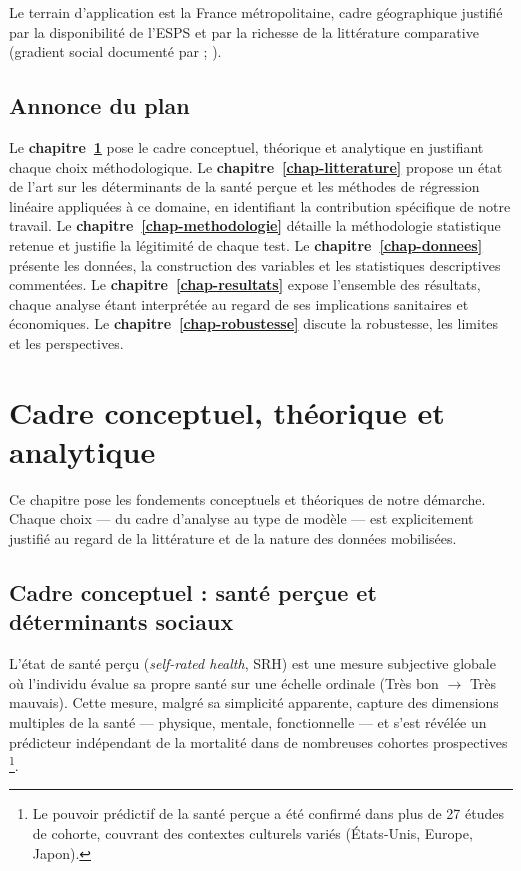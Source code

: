 \documentclass[11pt,a4paper]{memoirerecherche}
\begin{document}
Le terrain d'application est la France métropolitaine, cadre géographique justifié par la disponibilité de l'ESPS et par la richesse de la littérature comparative (gradient social documenté par \textcite{van_doorslaer2004} ; \textcite{art2006}).

\hypertarget{annonce-du-plan}{%
\subsection{Annonce du plan}\label{annonce-du-plan}}

Le \textbf{chapitre~\ref{chap-cadre}} pose le cadre conceptuel, théorique et analytique en justifiant chaque choix méthodologique. Le \textbf{chapitre~\ref{chap-litterature}} propose un état de l'art sur les déterminants de la santé perçue et les méthodes de régression linéaire appliquées à ce domaine, en identifiant la contribution spécifique de notre travail. Le \textbf{chapitre~\ref{chap-methodologie}} détaille la méthodologie statistique retenue et justifie la légitimité de chaque test. Le \textbf{chapitre~\ref{chap-donnees}} présente les données, la construction des variables et les statistiques descriptives commentées. Le \textbf{chapitre~\ref{chap-resultats}} expose l'ensemble des résultats, chaque analyse étant interprétée au regard de ses implications sanitaires et économiques. Le \textbf{chapitre~\ref{chap-robustesse}} discute la robustesse, les limites et les perspectives.

\hypertarget{chap-cadre}{%
\section{Cadre conceptuel, théorique et analytique}\label{chap-cadre}}

Ce chapitre pose les fondements conceptuels et théoriques de notre démarche. Chaque choix --- du cadre d'analyse au type de modèle --- est explicitement justifié au regard de la littérature et de la nature des données mobilisées.

\hypertarget{cadre-conceptuel-santuxe9-peruxe7ue-et-duxe9terminants-sociaux}{%
\subsection{Cadre conceptuel : santé perçue et déterminants sociaux}\label{cadre-conceptuel-santuxe9-peruxe7ue-et-duxe9terminants-sociaux}}

L'état de santé perçu (\emph{self-rated health}, SRH) est une mesure subjective globale où l'individu évalue sa propre santé sur une échelle ordinale (Très bon \(\rightarrow\) Très mauvais). Cette mesure, malgré sa simplicité apparente, capture des dimensions multiples de la santé --- physique, mentale, fonctionnelle --- et s'est révélée un prédicteur indépendant de la mortalité dans de nombreuses cohortes prospectives \autocite{idler1997}\footnote{Le pouvoir prédictif de la santé perçue a été confirmé dans plus de 27 études de cohorte, couvrant des contextes culturels variés (États-Unis, Europe, Japon).}.
\end{document}

